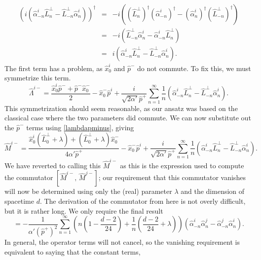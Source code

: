 \documentclass[a4paper,12pt]{article}
\numberwithin{equation}{section}
\begin{document}
\begin{eqnarray*}
\left(i\left(\hat{\alpha}_{-n}^i\hat{L}_n^\perp-\hat{L}_{-n}^\perp\hat{\alpha}_{n}^i\right)\right)^\dagger&=& -i\left((\hat{L}_n^\perp)^\dagger(\hat{\alpha}_{-n}^i)^\dagger - (\hat{\alpha}_n^i)^\dagger(\hat{L}_{-n}^\perp)^\dagger\right)\\
&=& -i\left(\hat{L}_{-n}^\perp\hat{\alpha}_n^i - \hat{\alpha}_{-n}^i\hat{L}_n^\perp\right)\\
&=& i\left(\hat{\alpha}_{-n}^i\hat{L}_n^\perp - \hat{L}_{-n}^\perp\hat{\alpha}_n^i\right).
\end{eqnarray*}
The first term has a problem, as $\hat{x}_0^i$ and $\hat{p}^-$ do not commute. To fix this, we must symmetrize this term. 
\begin{equation}
\hat{\Lambda}^{i-} = \frac{\hat{x}_0^i \hat{p}^- + \hat{p}^-\hat{x}_0^-}{2}-\hat{x}_0^- \hat{p}^i +\frac{i}{\sqrt{2\alpha'}\hat{p}^+}\sum_{n=1}^\infty\frac{1}{n}\left(\hat{\alpha}_{-n}^i\hat{L}_n^\perp-\hat{L}_{-n}^\perp\hat{\alpha}_{n}^i\right).
\end{equation}
This symmetrization should seem reasonable, as our ansatz was based on the classical case where the two parameters did commute. We can now substitute out the $\hat{p}^-$ terms using \ref{lambdapminus}, giving
\begin{equation}
\hat{M}^{i-} = \frac{\hat{x}_0^i(\hat{L}_0^\perp +\lambda) + (\hat{L}_0^\perp+\lambda)\hat{x}_0^-}{4\alpha'\hat{p}^+}-\hat{x}_0^- \hat{p}^i +\frac{i}{\sqrt{2\alpha'}\hat{p}^+}\sum_{n=1}^\infty\frac{1}{n}\left(\hat{\alpha}_{-n}^i\hat{L}_n^\perp-\hat{L}_{-n}^\perp\hat{\alpha}_{n}^i\right).
\end{equation}  
We have reverted to calling this $\hat{M}^{i-}$ as this is the expression used to compute the commutator $[\hat{M}^{i-},\,\hat{M}^{j-}]$; our requirement that this commutator vanishes will now be determined using only the (real) parameter $\lambda$ and the dimension of spacetime $d$. The derivation of the commutator from here is not overly difficult, but it is rather long\cite{bering}. We only require the final result
\begin{equation}
[\hat{M}^{i-},\,\hat{M}^{j-}] = -\frac{1}{\alpha'(\hat{p}^+)^2}\sum_{n=1}^\infty\left(n\left(1-\frac{d-2}{24}\right)+\frac{1}{n}\left(\frac{d-2}{24}+\lambda\right)\right)\left(\hat{\alpha}_{-n}^i\hat{\alpha}_n^j-\hat{\alpha}_{-n}^j\hat{\alpha}_n^i\right).
\end{equation}
In general, the operator terms will not cancel, so the vanishing requirement is equivalent to saying that the constant terms,
\end{document}
